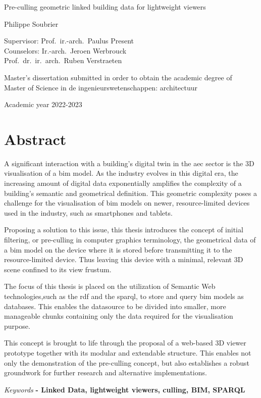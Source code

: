 \begin{center}
    \sffamily
    \huge Pre-culling geometric linked building data
    for lightweight viewers

    \Large Philippe Soubrier

    \normalsize
    Supervisor: Prof.\ ir.-arch.\ Paulus Present         \\
    Counselors: Ir.-arch.\ Jeroen Werbrouck \\
    Prof.\ dr.\ ir.\ arch.\ Ruben Verstraeten
\end{center}

Master’s dissertation submitted in order to obtain the academic degree of \\
Master of Science in de ingenieurswetenschappen: architectuur

Academic year 2022-2023
\section*{\LARGE Abstract}

A significant interaction with a building's digital twin in the \ac{aec} sector is the 3D visualisation of a \ac{bim} model. As the industry evolves in this digital era, the increasing amount of digital data exponentially amplifies the complexity of a building's semantic and geometrical definition. This geometric complexity poses a challenge for the visualisation of \ac{bim} models on newer, resource-limited devices used in the industry, such as smartphones and tablets.

Proposing a solution to this issue, this thesis introduces the concept of initial filtering, or pre-culling in computer graphics terminology, the geometrical data of a \ac{bim} model on the device where it is stored before transmitting it to the resource-limited device. Thus leaving this device with a minimal, relevant 3D scene confined to its view frustum.

The focus of this thesis is placed on the utilization of Semantic Web technologies,such as the \ac{rdf} and the \ac{sparql}, to store and query \ac{bim} models as databases. This enables the datasource to be divided into smaller, more manageable chunks containing only the data required for the visualisation purpose.

This concept is brought to life through the proposal of a web-based 3D viewer prototype together with its modular and extendable structure. This enables not only the demonstration of the pre-culling concept, but also establishes a robust groundwork for further research and alternative implementations.
                   
\vfill
\emph{Keywords} \textbf{
    - Linked Data, lightweight viewers, culling, BIM, SPARQL
}
